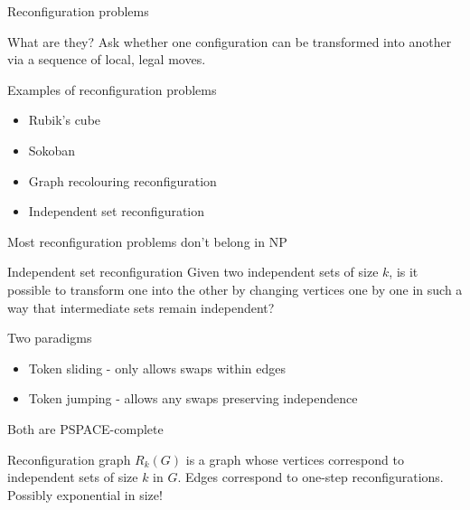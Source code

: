 \begin{frame}{Reconfiguration problems}
    \begin{heading}{What are they?}
Ask whether one configuration can be transformed into another via a sequence of local, legal moves.
    \end{heading}
    \begin{heading}{Examples of reconfiguration problems}
    \begin{itemize}
        \item Rubik's cube
        \item Sokoban
        \item Graph recolouring reconfiguration
        \item Independent set reconfiguration
    \end{itemize}
    \end{heading}
    \pause
    Most reconfiguration problems don't belong in NP
\end{frame}


\begin{frame}{Independent set reconfiguration}
        Given two independent sets of size \(k\), is it possible to transform one into the other by changing vertices one by one in such a way that intermediate sets remain independent?
    \vspace{1em}
    \pause
    \begin{heading}{Two paradigms}
    \begin{itemize}
        \item Token sliding - only allows swaps within edges
        \item Token jumping - allows any swaps preserving independence
    \end{itemize}
    \end{heading}

    Both are PSPACE-complete
\end{frame}





\begin{frame}{}
    \begin{fact}{Reconfiguration graph \(R_k(G)\)} is a graph whose vertices correspond to independent sets of size \(k\) in \(G\). Edges correspond to one-step reconfigurations. Possibly exponential in size!
    \end{fact}
    \vspace{1em}
    \vspace{-2em}
    \begin{figure}
        \centering
        
    \end{figure}
\end{frame}

